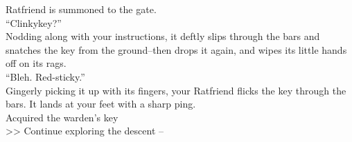 Ratfriend is summoned to the gate.\\

“Clinkykey?”\\

Nodding along with your instructions, it deftly slips through the bars and snatches the key from the ground--then drops it again, and wipes its little hands off on its rags.\\
“Bleh. Red-sticky.”\\

Gingerly picking it up with its fingers, your Ratfriend flicks the key through the bars. It lands at your feet with a sharp ping.\\
 Acquired the warden's key\\

>> Continue exploring the descent -- 